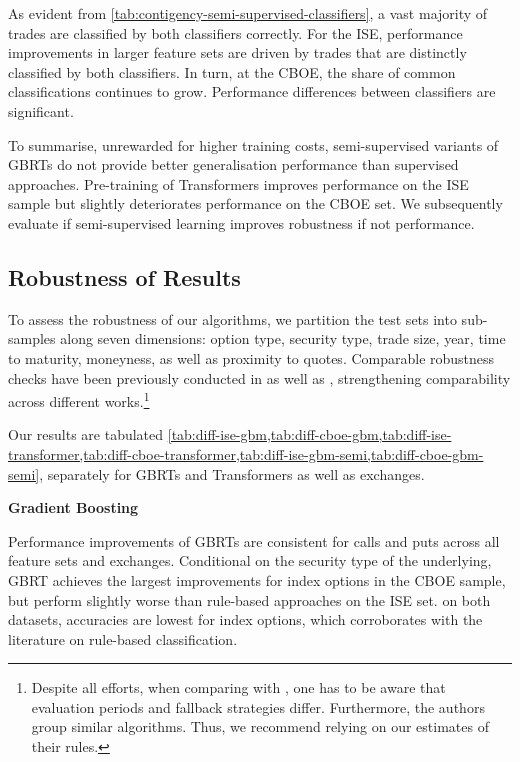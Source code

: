 As evident from \cref{tab:contigency-semi-supervised-classifiers}, a vast majority of trades are classified by both classifiers correctly. For the \gls{ISE}, performance improvements in larger feature sets are driven by trades that are distinctly classified by both classifiers. In turn, at the \gls{CBOE}, the share of common classifications continues to grow. Performance differences between classifiers are significant.    

To summarise, unrewarded for higher training costs, semi-supervised variants of \glspl{GBRT} do not provide better generalisation performance than supervised approaches. Pre-training of Transformers improves performance on the \gls{ISE} sample but slightly deteriorates performance on the \gls{CBOE} set. We subsequently evaluate if semi-supervised learning improves robustness if not performance.

\subsection{Robustness of Results}\label{sec:robustness-checks}


To assess the robustness of our algorithms, we partition the test sets into sub-samples along seven dimensions: option type, security type, trade size, year, time to maturity, moneyness, as well as proximity to quotes. Comparable robustness checks have been previously conducted in \textcite[][47]{grauerOptionTradeClassification2022} as well as  \textcite[][890--892]{savickasInferringDirectionOption2003}, strengthening comparability across different works.\footnote{Despite all efforts, when comparing with \textcite[][47--52]{grauerOptionTradeClassification2022}, one has to be aware that evaluation periods and fallback strategies differ. Furthermore, the authors group similar algorithms. Thus, we recommend relying on our estimates of their rules.}

Our results are tabulated \cref{tab:diff-ise-gbm,tab:diff-cboe-gbm,tab:diff-ise-transformer,tab:diff-cboe-transformer,tab:diff-ise-gbm-semi,tab:diff-cboe-gbm-semi}, separately for \glspl{GBRT} and Transformers as well as exchanges.

\clearpage

\textbf{Gradient Boosting}

Performance improvements of \glspl{GBRT} are consistent for calls and puts across all feature sets and exchanges. Conditional on the security type of the underlying, \gls{GBRT} achieves the largest improvements for index options in the \gls{CBOE} sample, but perform slightly worse than rule-based approaches on the \gls{ISE} set. on both datasets, accuracies are lowest for index options, which corroborates with the literature on rule-based classification.

